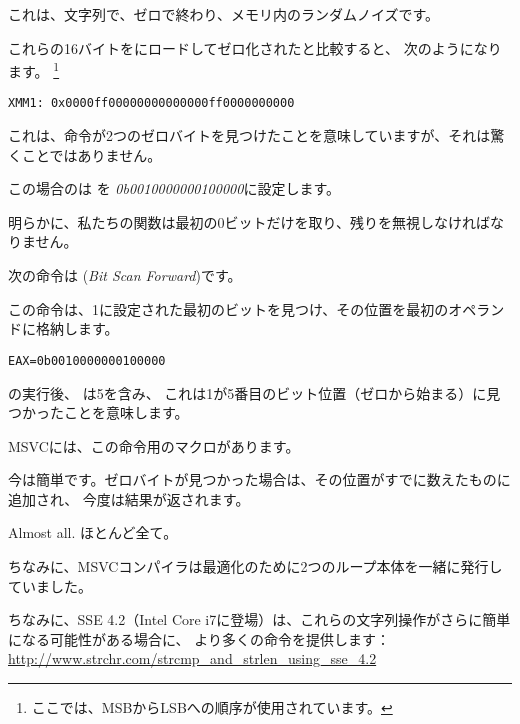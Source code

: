 これは、文字列で、ゼロで終わり、メモリ内のランダムノイズです。

これらの16バイトをにロードしてゼロ化されたと比較すると、
次のようになります。
\footnote{ここでは、\ac{MSB}から\ac{LSB}への順序が使用されています。}

\begin{verbatim}
XMM1: 0x0000ff00000000000000ff0000000000
\end{verbatim}

これは、命令が2つのゼロバイトを見つけたことを意味していますが、それは驚くことではありません。
 
この場合のは \EAX を
\emph{0b0010000000100000}に設定します。

明らかに、私たちの関数は最初の0ビットだけを取り、残りを無視しなければなりません。

\label{instruction_BSF}
次の命令は (\emph{Bit Scan Forward})です。

この命令は、1に設定された最初のビットを見つけ、その位置を最初のオペランドに格納します。

\begin{verbatim}
EAX=0b0010000000100000
\end{verbatim}

の実行後、 \EAX は5を含み、
これは1が5番目のビット位置（ゼロから始まる）に見つかったことを意味します。

MSVCには、この命令用のマクロがあります。

今は簡単です。ゼロバイトが見つかった場合は、その位置がすでに数えたものに追加され、
今度は結果が返されます。

Almost all.
ほとんど全て。

ちなみに、MSVCコンパイラは最適化のために2つのループ本体を一緒に発行していました。

ちなみに、SSE 4.2（Intel Core i7に登場）は、これらの文字列操作がさらに簡単になる可能性がある場合に、
より多くの命令を提供します：\url{http://www.strchr.com/strcmp_and_strlen_using_sse_4.2}
